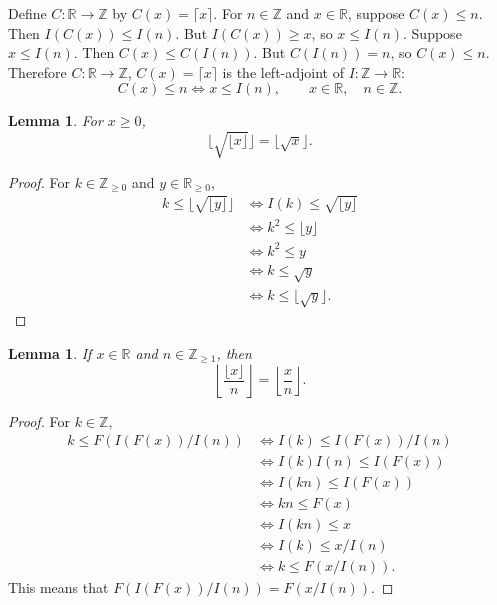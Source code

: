 \documentclass{article}
\newtheorem{lemma}[theorem]{Lemma}
\theoremstyle{definition}
\begin{document}
Define $C:\mathbb{R} \to \mathbb{Z}$ by  $C(x)=\lceil x \rceil$.
For $n \in \mathbb{Z}$ and $x \in \mathbb{R}$,
suppose $C(x) \leq n$. Then $I(C(x)) \leq I(n)$. But $I(C(x)) \geq x$, so
$x \leq I(n)$. Suppose $x \leq I(n)$. Then
$C(x) \leq C(I(n))$. But 
$C(I(n))=n$, so
$C(x) \leq n$. Therefore 
$C:\mathbb{R} \to \mathbb{Z}$, $C(x) = \lceil x \rceil$ is the left-adjoint of $I:\mathbb{Z} \to \mathbb{R}$:
\[
C(x) \leq n \iff x \leq I(n),\qquad x \in \mathbb{R},\quad n \in \mathbb{Z}.
\]


\begin{lemma}
For $x \geq 0$,
\[
\lfloor \sqrt{\lfloor x \rfloor} \rfloor = \lfloor \sqrt{x} \rfloor.
\]
\end{lemma}
\begin{proof}
For $k \in \mathbb{Z}_{\geq 0}$ and $y \in \mathbb{R}_{\geq 0}$,
\begin{align*}
k \leq \lfloor \sqrt{\lfloor y \rfloor} \rfloor&\iff I(k) \leq \sqrt{\lfloor y \rfloor}\\
&\iff k^2 \leq \lfloor y \rfloor\\
&\iff k^2 \leq y\\
&\iff k \leq \sqrt{y}\\
&\iff k \leq \lfloor \sqrt{y} \rfloor.
\end{align*}
\end{proof}


\begin{lemma}
If $x \in \mathbb{R}$ and $n \in \mathbb{Z}_{\geq 1}$, then
\[
\left\lfloor \frac{\lfloor x \rfloor}{n} \right\rfloor = \left\lfloor \frac{x}{n} \right\rfloor.
\]
\end{lemma}
\begin{proof}
For $k \in \mathbb{Z}$,
\begin{align*}
k\leq F(I(F(x))/I(n))&\iff I(k) \leq I(F(x))/I(n)\\
&\iff I(k) I(n) \leq I(F(x))\\
&\iff I(kn) \leq I(F(x))\\
&\iff kn \leq F(x)\\
&\iff I(kn) \leq x\\
&\iff I(k) \leq x/I(n)\\
&\iff k \leq F(x/I(n)).
\end{align*}
This means that $F(I(F(x))/I(n)) = F(x/I(n))$.
\end{proof}
\end{document}
